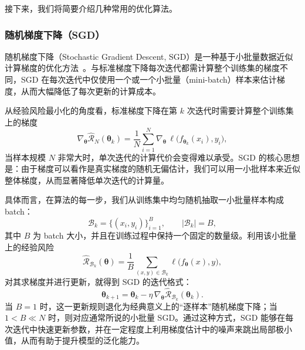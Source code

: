 接下来，我们将简要介绍几种常用的优化算法。

\subsubsection{随机梯度下降（SGD）}
随机梯度下降（Stochastic Gradient Descent, SGD）是一种基于小批量数据近似计算梯度的优化方法~\cite{robbins1951stochastic}。与标准梯度下降每次迭代都需计算整个训练集的梯度不同，SGD 在每次迭代中仅使用一个或一个小批量（mini-batch）样本来估计梯度，从而大幅降低了每次更新的计算成本。

从经验风险最小化的角度看，标准梯度下降在第 $k$ 次迭代时需要计算整个训练集上的梯度
\begin{equation}
    \nabla_{\bm{\theta}} \hat{\mathcal{R}}_N(\bm{\theta}_k)
    = \frac{1}{N} \sum_{i=1}^{N}
    \nabla_{\bm{\theta}} \, \ell\bigl(f_{\bm{\theta}_k}(x_i), y_i\bigr),
\end{equation}
当样本规模 $N$ 非常大时，单次迭代的计算代价会变得难以承受。SGD 的核心思想是：由于梯度可以看作是真实梯度的随机无偏估计，我们可以用一小批样本来近似整体梯度，从而显著降低单次迭代的计算量。

具体而言，在算法的每一步，我们从训练集中均匀随机抽取一小批量样本构成 batch：
\begin{equation}
    \mathcal{B}_k = \bigl\{(x_i, y_i)\bigr\}_{i=1}^{B}, \qquad |\mathcal{B}_k| = B,
\end{equation}
其中 $B$ 为 batch 大小，并且在训练过程中保持一个固定的数量级。利用该小批量上的经验风险
\begin{equation}
    \hat{\mathcal{R}}_{\mathcal{B}_k}(\bm{\theta})
    = \frac{1}{B} \sum_{(x,y) \in \mathcal{B}_k}
    \ell\bigl(f_{\bm{\theta}}(x), y\bigr),
\end{equation}
对其求梯度并进行更新，就得到 SGD 的迭代格式：
\begin{equation}
    \bm{\theta}_{k+1}
    = \bm{\theta}_{k}
    - \eta \,\nabla_{\bm{\theta}}
    \hat{\mathcal{R}}_{\mathcal{B}_k}(\bm{\theta}_{k}).
\end{equation}
当 $B=1$ 时，这一更新规则退化为经典意义上的“逐样本”随机梯度下降；当 $1 < B \ll N$ 时，则对应通常所说的小批量 SGD。通过这种方式，SGD 能够在每次迭代中快速更新参数，并在一定程度上利用梯度估计中的噪声来跳出局部极小值，从而有助于提升模型的泛化能力。

